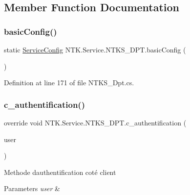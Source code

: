 \subsection{Member Function Documentation}
\mbox{\label{class_n_t_k_1_1_service_1_1_n_t_k_s___d_p_t_ac63e401d56518d2e0042c79422be7827}} 
\subsubsection{\texorpdfstring{basicConfig()}{basicConfig()}}
{\footnotesize\ttfamily static \mbox{\hyperlink{struct_n_t_k_1_1_service_1_1_service_config}{Service\+Config}} N\+T\+K.\+Service.\+N\+T\+K\+S\+\_\+\+D\+P\+T.\+basic\+Config (\begin{DoxyParamCaption}{ }\end{DoxyParamCaption})\hspace{0.3cm}{\ttfamily [static]}}



Definition at line 171 of file N\+T\+K\+S\+\_\+\+Dpt.\+cs.

\mbox{\label{class_n_t_k_1_1_service_1_1_n_t_k_s___d_p_t_a6ebeaaab18026e60204f922c8f3780cb}} 
\subsubsection{\texorpdfstring{c\_authentification()}{c\_authentification()}}
{\footnotesize\ttfamily override void N\+T\+K.\+Service.\+N\+T\+K\+S\+\_\+\+D\+P\+T.\+c\+\_\+authentification (\begin{DoxyParamCaption}\item[{\mbox{\hyperlink{class_n_t_k_1_1_n_t_k_user}{N\+T\+K\+User}}}]{user }\end{DoxyParamCaption})\hspace{0.3cm}{\ttfamily [virtual]}}



Methode d\textquotesingle{}authentification coté client 


\begin{DoxyParams}{Parameters}
{\em user} & \\
\hline
\end{DoxyParams}


